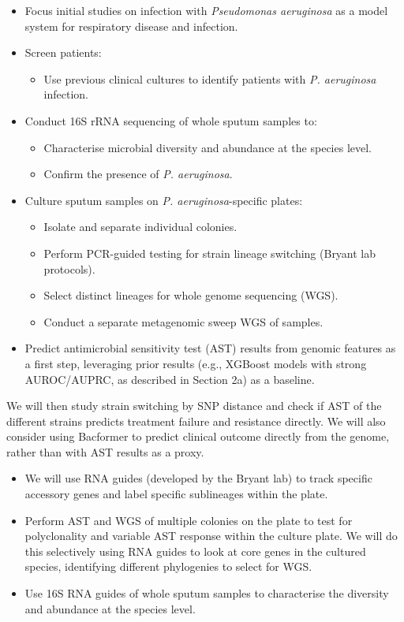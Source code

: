 \documentclass{article}
\begin{document}
\begin{itemize}
  \item Focus initial studies on infection with \textit{Pseudomonas aeruginosa} as a model system for respiratory disease and infection.
  \item Screen patients:
    \begin{itemize}
      \item Use previous clinical cultures to identify patients with \textit{P. aeruginosa} infection.
    \end{itemize}
  \item Conduct 16S rRNA sequencing of whole sputum samples to:
    \begin{itemize}
      \item Characterise microbial diversity and abundance at the species level.
      \item Confirm the presence of \textit{P. aeruginosa}.
    \end{itemize}
  \item Culture sputum samples on \textit{P. aeruginosa}-specific plates:
    \begin{itemize}
      \item Isolate and separate individual colonies.
      \item Perform PCR-guided testing for strain lineage switching (Bryant lab protocols).
      \item Select distinct lineages for whole genome sequencing (WGS).
      \item Conduct a separate metagenomic sweep WGS of samples.
    \end{itemize}
  \item Predict antimicrobial sensitivity test (AST) results from genomic features as a first step, leveraging prior results (e.g., XGBoost models with strong AUROC/AUPRC, as described in Section 2a) as a baseline.
\end{itemize}

We will then study strain switching by SNP distance and check if AST of the different strains predicts 
treatment failure and resistance directly.  
We will also consider using Bacformer to predict clinical outcome directly from the genome, rather than with AST results as a proxy. 

\begin{itemize}
  \item We will use RNA guides (developed by the Bryant lab) to track specific accessory genes and label specific sublineages within the plate.
  \item Perform AST and WGS of multiple colonies on the plate to test for polyclonality and variable AST response within the culture plate. We will do this selectively using RNA guides to look at core genes in the cultured species, identifying different phylogenies to select for WGS.
  \item Use 16S RNA guides of whole sputum samples to characterise the diversity and abundance at the species level.
\end{itemize}
\end{document}
